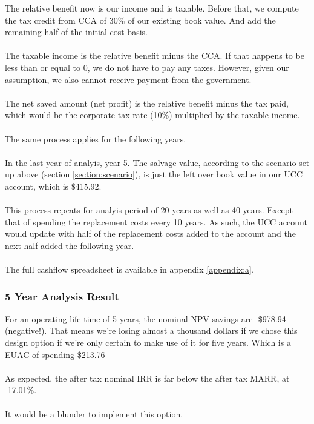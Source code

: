\documentclass[10pt,letterpaper]{article}
\begin{document}
The relative benefit now is our income and is taxable. Before that, we compute the tax credit from CCA of 30\% of our existing book value. And add the remaining half of the initial cost basis.\\
\\
The taxable income is the relative benefit minus the CCA. If that happens to be less than or equal to 0, we do not have to pay any taxes. However, given our assumption, we also cannot receive payment from the government.\\
\\
The net saved amount (net profit) is the relative benefit minus the tax paid, which would be the corporate tax rate (10\%)\cite{business-tax} multiplied by the taxable income.\\
\\
The same process applies for the following years.\\
\\
In the last year of analyis, year 5. The salvage value, according to the scenario set up above (section \ref{section:scenario}), is just the left over book value in our UCC account, which is \$415.92.\\
\\
This process repeats for analyis period of 20 years as well as 40 years. Except that of spending the replacement costs every 10 years. As such, the UCC account would update with half of the replacement costs added to the account and the next half added the following year.\\
\\
The full cashflow spreadsheet is available in appendix \ref{appendix:a}.

\subsubsection{5 Year Analysis Result}

For an operating life time of 5 years, the nominal NPV savings are -\$978.94 (negative!). That means we're losing almost a thousand dollars if we chose this design option if we're only certain to make use of it for five years. Which is a EUAC of spending \$213.76\\
\\
As expected, the after tax nominal IRR is far below the after tax MARR, at -17.01\%.\\
\\
It would be a blunder to implement this option.\\
\end{document}
